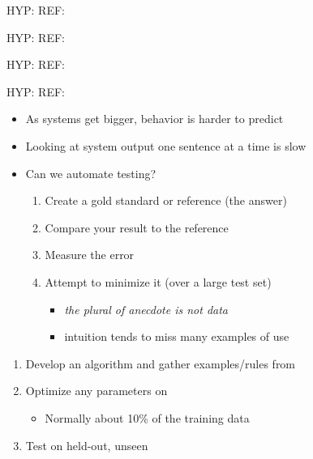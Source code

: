 \documentclass[a4paper,landscape,headrule,footrule,dvips]{foils}
\begin{document}
\begin{CJK}{UTF8}{min}
\begin{exe}
\ex 
  \begin{xlist}
    \ex HYP:  
    \ex REF:  
  \end{xlist}
\medskip
\ex 
  \begin{xlist}
    \ex HYP:  
    \ex REF:  
  \end{xlist}
\medskip
\ex 
  \begin{xlist}
    \ex HYP:  
    \ex REF:  
  \end{xlist}
\medskip
\ex
 \begin{xlist}
    \ex HYP:  
    \ex REF:  
  \end{xlist}
\end{exe}


\MyLogo{}
\begin{itemize}
\item As systems get bigger, behavior is harder to predict
\item Looking at system output one sentence at a time is slow

\item Can we automate testing?
  \begin{enumerate}
  \item Create a gold standard or reference (the  answer)
  \item Compare your result to the reference
  \item Measure the error
  \item Attempt to minimize it  (over a large test set)
    \begin{itemize}
    \item \textit{the plural of anecdote is not data}
    \item intuition tends to miss many examples of use
    \end{itemize}
  \end{enumerate} 

\end{itemize}


\begin{enumerate}
\item Develop an algorithm and gather examples/rules from 
\item Optimize any parameters on 
  \begin{itemize}
  \item Normally about 10\% of the training data
  \end{itemize}
\item Test on held-out, unseen 
\end{enumerate}


\end{CJK}
\end{document}
